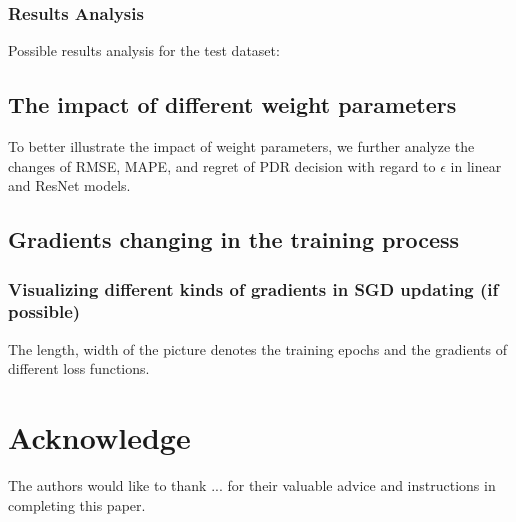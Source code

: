 \documentclass[journal]{IEEEtran}
\begin{document}
\subsubsection{Results Analysis}
Possible results analysis for the test dataset:

\subsection{The impact of different weight parameters}

To better illustrate the impact of weight parameters, we further analyze the changes of RMSE, MAPE, and regret of PDR decision with regard to $\epsilon$ in linear and ResNet models.

\subsection{Gradients changing in the training process}


\subsubsection{Visualizing different kinds of gradients in SGD updating (if possible)} 
The length, width of the picture denotes the training epochs and the gradients of different loss functions.


\section*{Acknowledge}
The authors would like to thank ... for their valuable advice and instructions in completing this paper.
\end{document}

